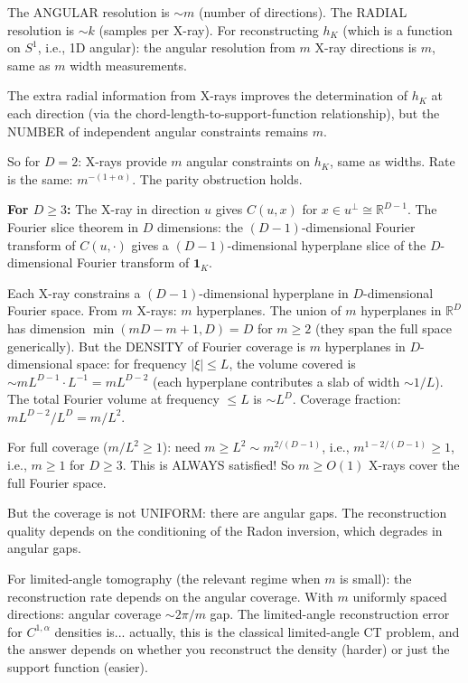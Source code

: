 The ANGULAR resolution is $\sim m$ (number of directions). The RADIAL resolution is $\sim k$ (samples per X-ray). For reconstructing $h_K$ (which is a function on $S^1$, i.e., 1D angular): the angular resolution from $m$ X-ray directions is $m$, same as $m$ width measurements.

The extra radial information from X-rays improves the determination of $h_K$ at each direction (via the chord-length-to-support-function relationship), but the NUMBER of independent angular constraints remains $m$.

So for $D = 2$: X-rays provide $m$ angular constraints on $h_K$, same as widths. Rate is the same: $m^{-(1+\alpha)}$. The parity obstruction holds. \checkmark

\textbf{For $D \geq 3$:} The X-ray in direction $u$ gives $C(u, x)$ for $x \in u^\perp \cong \mathbb{R}^{D-1}$. The Fourier slice theorem in $D$ dimensions: the $(D-1)$-dimensional Fourier transform of $C(u, \cdot)$ gives a $(D-1)$-dimensional hyperplane slice of the $D$-dimensional Fourier transform of $\mathbf{1}_K$.

Each X-ray constrains a $(D-1)$-dimensional hyperplane in $D$-dimensional Fourier space. From $m$ X-rays: $m$ hyperplanes. The union of $m$ hyperplanes in $\mathbb{R}^D$ has dimension $\min(mD - m + 1, D) = D$ for $m \geq 2$ (they span the full space generically). But the DENSITY of Fourier coverage is $m$ hyperplanes in $D$-dimensional space: for frequency $|\xi| \leq L$, the volume covered is $\sim m L^{D-1} \cdot L^{-1} = m L^{D-2}$ (each hyperplane contributes a slab of width $\sim 1/L$). The total Fourier volume at frequency $\leq L$ is $\sim L^D$. Coverage fraction: $m L^{D-2} / L^D = m / L^2$.

For full coverage ($m/L^2 \geq 1$): need $m \geq L^2 \sim m^{2/(D-1)}$, i.e., $m^{1 - 2/(D-1)} \geq 1$, i.e., $m \geq 1$ for $D \geq 3$. This is ALWAYS satisfied! So $m \geq O(1)$ X-rays cover the full Fourier space.

But the coverage is not UNIFORM: there are angular gaps. The reconstruction quality depends on the conditioning of the Radon inversion, which degrades in angular gaps.

For limited-angle tomography (the relevant regime when $m$ is small): the reconstruction rate depends on the angular coverage. With $m$ uniformly spaced directions: angular coverage $\sim 2\pi/m$ gap. The limited-angle reconstruction error for $C^{1,\alpha}$ densities is... actually, this is the classical limited-angle CT problem, and the answer depends on whether you reconstruct the density (harder) or just the support function (easier).

